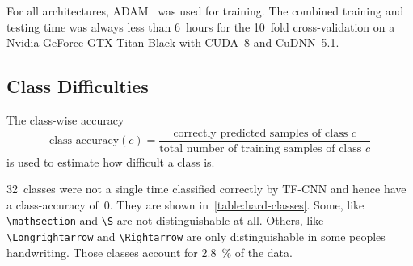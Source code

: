 For all architectures, ADAM~\cite{kingma2014adam} was used for training. The
combined training and testing time was always less than 6~hours for the 10~fold
cross-validation on a Nvidia GeForce GTX Titan Black with CUDA~8 and CuDNN~5.1.
\clearpage
\subsection{Class Difficulties}
The class-wise accuracy
\[\text{class-accuracy}(c) = \frac{\text{correctly predicted samples of class } c}{\text{total number of training samples of class } c}\]
is used to estimate how difficult a class is.

32~classes were not a single time classified correctly by TF-CNN and hence have
a class-accuracy of~0. They are shown in~\cref{table:hard-classes}. Some, like
\verb+\mathsection+ and \verb+\S+ are not distinguishable at all. Others, like
\verb+\Longrightarrow+ and
\verb+\Rightarrow+ are only distinguishable in some peoples handwriting.
Those classes account for \SI{2.8}{\percent} of the data.

